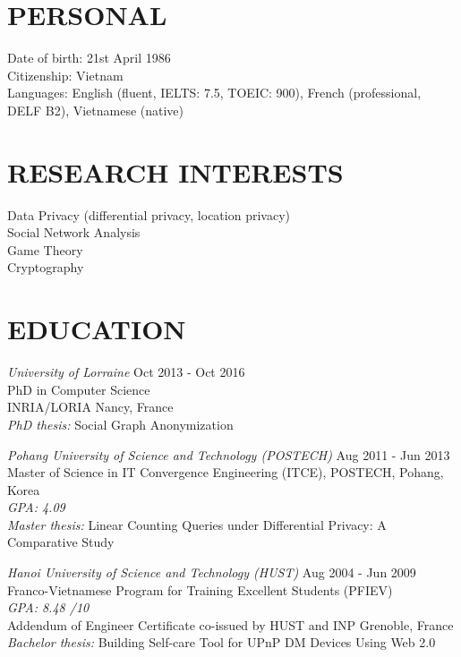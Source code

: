 \documentclass[margin, 10pt]{res} %
\begin{document}
\begin{resume}

 
%

\section{PERSONAL}
Date of birth: 21st April 1986 \\
Citizenship: Vietnam \\
Languages: English (fluent, IELTS: 7.5, TOEIC: 900), French (professional, DELF B2), Vietnamese (native)

\section{RESEARCH INTERESTS}
Data Privacy (differential privacy, location privacy) \\
Social Network Analysis \\
Game Theory \\
Cryptography

\section{EDUCATION}

{\sl University of Lorraine}  \hfill Oct 2013 - Oct 2016 \\
PhD in Computer Science \\
INRIA/LORIA Nancy, France \\
{\sl PhD thesis:} Social Graph Anonymization

% 
{\sl Pohang University of Science and Technology (POSTECH)}  \hfill Aug 2011 - Jun 2013 \\
Master of Science in IT Convergence Engineering (ITCE), POSTECH, Pohang, Korea \\
{\sl GPA: 4.09} \\
{\sl Master thesis:} Linear Counting Queries under Differential Privacy: A Comparative Study

%
{\sl Hanoi University of Science and Technology (HUST)}  \hfill Aug 2004 - Jun 2009 \\
Franco-Vietnamese Program for Training Excellent Students (PFIEV) \\
{\sl GPA: 8.48 /10} \\
Addendum of Engineer Certificate co-issued by HUST and INP Grenoble, France \\
{\sl Bachelor thesis:} Building Self-care Tool for UPnP DM Devices Using Web 2.0


\end{resume}
\end{document}
